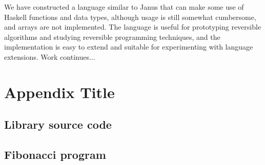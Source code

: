 \documentclass[10pt]{sigplanconf}
\begin{document}
We have constructed a language similar to Janus that can make some use
of Haskell functions and data types, although usage is still somewhat
cumbersome, and arrays are not implemented.  The language is useful
for prototyping reversible algorithms and studying reversible
programming techniques, and the implementation is easy to extend and
suitable for experimenting with language extensions.  Work
continues...







\appendix
\section{Appendix Title}

\subsection{Library source code}

\tiny{

}


\subsection{Fibonacci program}

\tiny{

}
\end{document}
